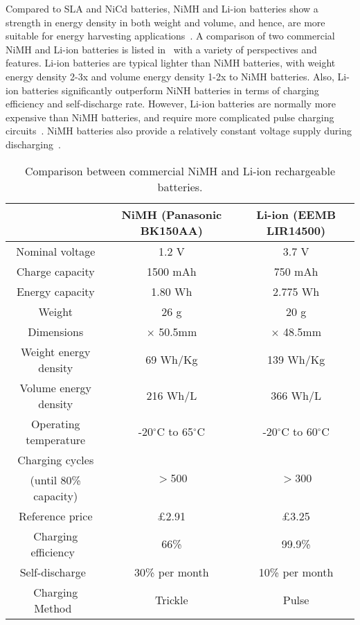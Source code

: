  Compared to SLA and NiCd batteries, NiMH and Li-ion batteries show a strength in energy density in both weight and volume, and hence, are more suitable for energy harvesting applications~\cite{raghunathan2005design, taneja2008design, akhtar2015energy, prauzek2018energy}. A comparison of two commercial NiMH and Li-ion batteries is listed in~ with a variety of perspectives and features. Li-ion batteries are typical lighter than NiMH batteries, with weight energy density 2-3x and volume energy density 1-2x to NiMH batteries. Also, Li-ion batteries significantly outperform NiNH batteries in terms of charging efficiency and self-discharge rate. However, Li-ion batteries are normally more expensive than NiMH batteries, and require more complicated pulse charging circuits~\cite{raghunathan2005design}. NiMH batteries also provide a relatively constant voltage supply during discharging~\cite{kansal2007power}. 

\begin{table}
    \renewcommand{\arraystretch}{1.2}
    \centering
    \begin{tabular}{|c|c|c|}
    \hline
     & NiMH (Panasonic BK150AA) & Li-ion (EEMB LIR14500) \\
    \hline
    Nominal voltage & 1.2 V & 3.7 V \\
    Charge capacity & 1500 mAh & 750 mAh \\
    Energy capacity & 1.80 Wh & 2.775 Wh \\
    Weight & 26 g & 20 g \\
    Dimensions & \diameter14.5mm $\times$ 50.5mm & \diameter14.1mm $\times$ 48.5mm \\
    Weight energy density & 69 Wh/Kg & 139 Wh/Kg \\
    Volume energy density & 216 Wh/L & 366 Wh/L \\
    Operating temperature & -20$^\circ$C to 65$^\circ$C & -20$^\circ$C to 60$^\circ$C \\
    Charging cycles & \multirow{2}{*}{$>$500} & \multirow{2}{*}{$>$300} \\
    (until 80\% capacity) & & \\
    Reference price & £2.91 & £3.25 \\ 
    Charging efficiency~\cite{prauzek2018energy} & 66\% & 99.9\% \\
    Self-discharge~\cite{prauzek2018energy} & 30\% per month & 10\% per month \\
    Charging Method~\cite{prauzek2018energy} & Trickle & Pulse \\
    \hline
    \end{tabular}
    \caption{Comparison between commercial NiMH and Li-ion rechargeable batteries.}
    \label{Table:nimhliion}
\end{table}

